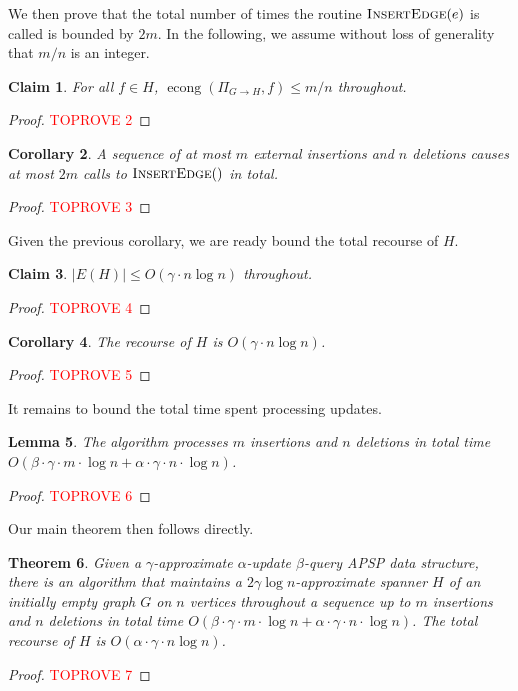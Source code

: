 \documentclass[11pt]{article}
\newtheorem{theorem}{Theorem}[section]
\newtheorem{corollary}[theorem]{Corollary}
\newtheorem{lemma}[theorem]{Lemma}
\newtheorem{claim}[theorem]{Claim}
\DeclareMathOperator{\econg}{econg}
\begin{document}
We then prove that the total number of times the routine $\textsc{InsertEdge}(e)$ is called is bounded by $2m$. In the following, we assume without loss of generality that $m/n$ is an integer. 

\begin{claim} \label{clm:econg}
    For all $f \in H$, $\econg(\Pi_{G \rightarrow H}, f) \leq m/n$ throughout.
\end{claim}
\begin{proof}\textcolor{red}{TOPROVE 2}\end{proof}

\begin{corollary}\label{corr:all_insertions}
    A sequence of at most $m$ external insertions and $n$ deletions causes at most $2m$ calls to $\textsc{InsertEdge}()$ in total.
\end{corollary}
\begin{proof}\textcolor{red}{TOPROVE 3}\end{proof}

Given the previous corollary, we are ready bound the total recourse of $H$. 

\begin{claim}\label{clm:number_edges}
    $|E(H)| \leq O(\gamma \cdot n \log n)$ throughout. 
\end{claim}
\begin{proof}\textcolor{red}{TOPROVE 4}\end{proof}
\begin{corollary} \label{cor:recourse}
    The recourse of $H$ is $O(\gamma \cdot n \log n)$.
\end{corollary}
\begin{proof}\textcolor{red}{TOPROVE 5}\end{proof}

It remains to bound the total time spent processing updates. 

\begin{lemma}\label{lma:runtime}
    The algorithm processes $m$ insertions and $n$ deletions in total time $O(\beta \cdot \gamma \cdot m 
\cdot \log n + \alpha \cdot \gamma \cdot n \cdot \log n)$. 
\end{lemma}
\begin{proof}\textcolor{red}{TOPROVE 6}\end{proof}

Our main theorem then follows directly.

\begin{theorem} \label{thm:main_apsp}
    Given a $\gamma$-approximate $\alpha$-update $\beta$-query APSP data structure, there is an algorithm that maintains a $2 \gamma \log n$-approximate spanner $H$ of an initially empty graph $G$ on $n$ vertices throughout a sequence up to $m$ insertions and $n$ deletions in total time $O(\beta \cdot \gamma \cdot m 
\cdot \log n  + \alpha \cdot \gamma \cdot n \cdot \log n)$. The total recourse of $H$ is $O(\alpha \cdot \gamma \cdot n \log n)$. 
\end{theorem}
\begin{proof}\textcolor{red}{TOPROVE 7}\end{proof}
\end{document}
